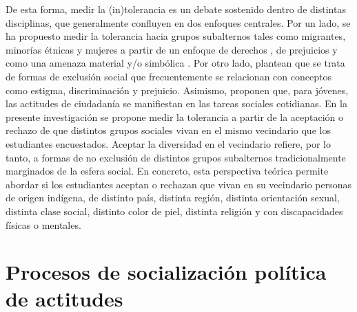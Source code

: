 \documentclass[12pt,twoside]{templates/facsothesis}
\begin{document}
De esta forma, medir la (in)tolerancia es un debate sostenido dentro de distintas disciplinas, que generalmente confluyen en dos enfoques centrales. Por un lado, se ha propuesto medir la tolerancia hacia grupos subalternos tales como migrantes, minorías étnicas y mujeres a partir de un enfoque de derechos \citep{miranda_Political_2018, trevino_Influence_2018}, de prejuicios \citep{meeusen_ParentChild_2015, weber_educational_2020} y como una amenaza material y/o simbólica \citep{raijman_Perceived_2004}. Por otro lado, \citet{diez-nicolas_Exclusion_2019} plantean que se trata de formas de exclusión social que frecuentemente se relacionan con conceptos como estigma, discriminación y prejuicio. Asimismo, \citet{tendam_Measuring_2011} proponen que, para jóvenes, las actitudes de ciudadanía se manifiestan en las tareas sociales cotidianas. En la presente investigación se propone medir la tolerancia a partir de la aceptación o rechazo de que distintos grupos sociales vivan en el mismo vecindario que los estudiantes encuestados. Aceptar la diversidad en el vecindario refiere, por lo tanto, a formas de no exclusión de distintos grupos subalternos tradicionalmente marginados de la esfera social. En concreto, esta perspectiva teórica permite abordar si los estudiantes aceptan o rechazan que vivan en su vecindario personas de origen indígena, de distinto país, distinta región, distinta orientación sexual, distinta clase social, distinto color de piel, distinta religión y con discapacidades físicas o mentales.

\hypertarget{procesos-de-socializaciuxf3n-poluxedtica-de-actitudes}{%
\section{Procesos de socialización política de actitudes}\label{procesos-de-socializaciuxf3n-poluxedtica-de-actitudes}}
\end{document}
